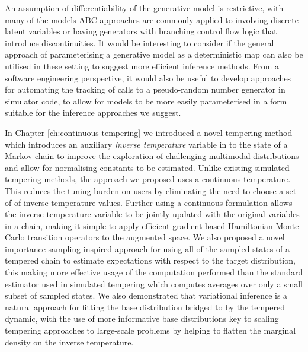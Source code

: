 An assumption of differentiability of the generative model is restrictive, with many of the models \ac{ABC} approaches are commonly applied to involving discrete latent variables or having generators with branching control flow logic that introduce discontinuities. It would be interesting to consider if the general approach of parameterising a generative model as a deterministic map can also be utilised in these setting to suggest more efficient inference methods. From a software engineering perspective, it would also be useful to develop approaches for automating the tracking of calls to a pseudo-random number generator in simulator code, to allow for models to be more easily parameterised in a form suitable for the inference approaches we suggest. %

In Chapter \ref{ch:continuous-tempering} we introduced a novel tempering method which introduces an auxiliary \emph{inverse temperature} variable in to the state of a Mark\-ov chain to improve the exploration of challenging multimodal distributions and allow for normalising constants to be estimated. Unlike existing simulated tempering methods, the approach we proposed uses a continuous temperature. This reduces the tuning burden on users by eliminating the need to choose a set of of inverse temperature values. Further using a continuous formulation allows the inverse temperature variable to be jointly updated with the original variables in a chain, making it simple to apply efficient gradient based Hamiltonian Monte Carlo transition operators to the augmented space. We also proposed a novel importance sampling inspired approach for using all of the sampled states of a tempered chain to estimate expectations with respect to the target distribution, this making more effective usage of the computation performed than the standard estimator used in simulated tempering which computes averages over only a small subset of sampled states. We also demonstrated that variational inference is a natural approach for fitting the base distribution bridged to by the tempered dynamic, with the use of more informative base distributions key to scaling tempering approaches to large-scale problems by helping to flatten the marginal density on the inverse temperature.


